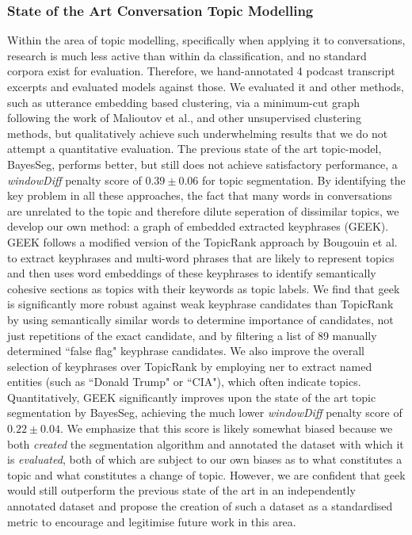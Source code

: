 \subsubsection{State of the Art Conversation Topic Modelling}
    Within the area of topic modelling, specifically when applying it to conversations, research is much less active than within \gls{da} classification, and no standard corpora exist for evaluation. Therefore, we hand-annotated 4 podcast transcript excerpts and evaluated \glspl{model} against those. We evaluated it and other methods, such as \gls{utterance} \gls{embedding} based clustering, via a minimum-cut graph following the work of Malioutov et al., and other unsupervised clustering methods, but qualitatively achieve such underwhelming results that we do not attempt a quantitative evaluation. The previous state of the art topic-\gls{model}, BayesSeg, performs better, but still does not achieve satisfactory performance, a \textit{windowDiff} penalty score of $0.39 \pm 0.06$ for topic segmentation.
    By identifying the key problem in all these approaches, the fact that many words in conversations are unrelated to the topic and therefore dilute seperation of dissimilar topics, we develop our own method: a graph of embedded extracted \glspl{keyphrase} (GEEK).
    GEEK follows a modified version of the TopicRank approach by Bougouin et al. to extract \glspl{keyphrase} and multi-word phrases that are likely to represent topics and then uses word \glspl{embedding} of these \glspl{keyphrase} to identify semantically cohesive sections as topics with their keywords as topic labels. We find that \gls{geek} is significantly more robust against weak \gls{keyphrase} candidates than TopicRank by using semantically similar words to determine importance of candidates, not just repetitions of the exact candidate, and by filtering a list of 89 manually determined ``false flag" \gls{keyphrase} candidates. We also improve the overall selection of \glspl{keyphrase} over TopicRank by employing \gls{ner} to extract named entities (such as ``Donald Trump" or ``CIA"), which often indicate topics. Quantitatively, GEEK significantly improves upon the state of the art topic segmentation by BayesSeg, achieving the much lower \textit{windowDiff} penalty score of $\mathbf{0.22 \pm 0.04}$. We emphasize that this score is likely somewhat biased because we both \textit{created} the segmentation algorithm and annotated the dataset with which it is \textit{evaluated}, both of which are subject to our own biases as to what constitutes a topic and what constitutes a change of topic. However, we are confident that \gls{geek} would still outperform the previous state of the art in an independently annotated dataset and propose the creation of such a dataset as a standardised metric to encourage and legitimise future work in this area.

